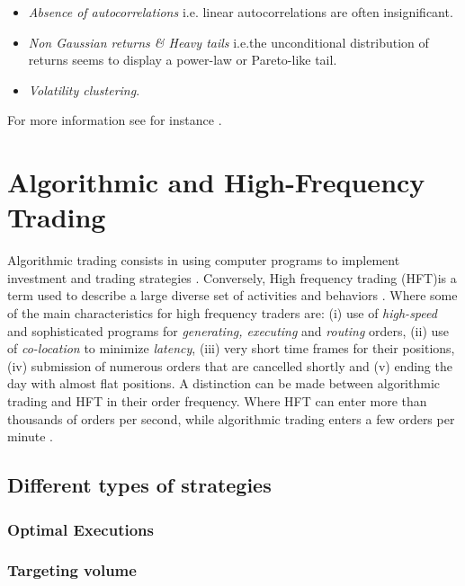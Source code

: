 \documentclass{kththesis}
\theoremstyle{definition}
\begin{document}
\begin{itemize}
    \item \textit{Absence of autocorrelations} i.e. linear autocorrelations are often insignificant. 
    \item \textit{Non Gaussian returns \& Heavy tails} i.e.the unconditional distribution of returns seems to display a power-law or Pareto-like tail.
    \item \textit{Volatility clustering}. 
\end{itemize}
For more information see for instance \textcite{cont2001empirical}.

\section{Algorithmic and High-Frequency Trading}
Algorithmic trading consists in using computer programs to implement investment and trading strategies \parencite{abergel2012market}. Conversely, High frequency trading (HFT)is a term used to describe a large diverse set of activities and behaviors \parencite{o2015high}. Where some of the main characteristics for high frequency traders are: (i) use of \textit{high-speed} and sophisticated programs for \textit{generating, executing} and \textit{routing} orders, (ii) use of \textit{co-location} to minimize \textit{latency}, (iii) very short time frames for their positions, (iv) submission of numerous orders that are cancelled shortly and (v) ending the day with almost flat positions. 
\newline
\newline
A distinction can be made between algorithmic trading and HFT in their order frequency. Where HFT can enter more than thousands of orders per second, while algorithmic trading enters a few orders per minute \parencite{abergel2012market}.

\subsection{Different types of strategies}

\subsubsection*{Optimal Executions}

\subsubsection*{Targeting volume}
\end{document}
